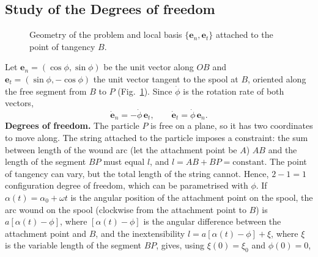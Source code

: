 \documentclass[11pt,a4paper]{article}
\newcommand{\dt}[1]{\dot{#1}}
\newcommand{\en}{\bm{e}_n}
\newcommand{\et}{\bm{e}_t}
\begin{document}
\subsection{Study of the Degrees of freedom}
\begin{figure}[htbp]
\centering
{}
\caption{Geometry of the problem and local basis $\{\en,\et\}$ attached to the point of tangency $B$.}\label{fig:geom}
\end{figure}
Let $\en=(\cos\phi,\sin\phi)$ be the unit vector along $OB$ and $\et=(\sin\phi,-\cos\phi)$ the unit vector tangent to the spool
at $B$, oriented along the free segment from $B$ to $P$ (Fig.~\ref{fig:geom}). Since $\dt{\phi}$ is the rotation rate of both
vectors,
\begin{equation}
\dt{\bm e}_n=-\dt{\phi}\,\et,\qquad \dt{\bm e}_t=\dt{\phi}\,\en .
\label{eq:basis}
\end{equation}
\textbf{Degrees of freedom.} The particle $P$ is free on a plane, so it has two coordinates to move along. The string attached to the particle imposes a constraint: the sum between length of the wound arc (let the attachment point be $A$) $AB$ and the length of the segment $BP$ must equal $l$, and $l = AB + BP = \text{constant}$. The point of tangency can vary, but the total length of the string cannot. Hence, $2-1=1$ configuration degree of freedom, which can be parametrised with $\phi$.
If $\alpha(t)=\alpha_0+\omega t$ is the angular position of the attachment point on the spool, the arc wound on the spool (clockwise from the attachment point to $B$) is $a[\alpha(t)-\phi]$, where $[\alpha(t)-\phi]$ is the angular difference between the attachment point and $B$, and the inextensibility $l=a[\alpha(t)-\phi]+\xi$, where $\xi$ is the variable length of the segment $BP$, gives, using $\xi(0)=\xi_0$ and $\phi(0)=0$,
\end{document}
